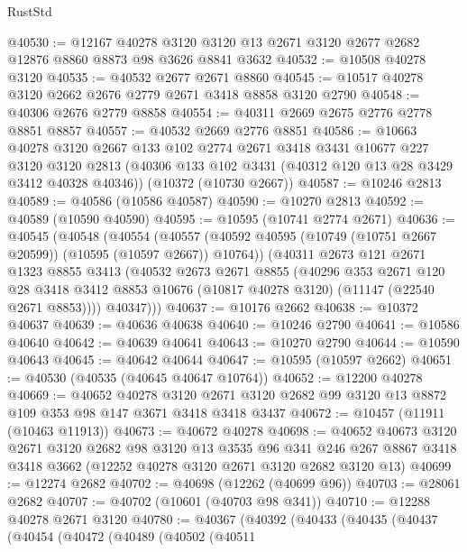 \begin{lexlean}{RustStd}
\begin{coremodule}
@40530 := @12167
    @40278
    @3120
    @3120
    @13
    @2671
    @3120
    @2677
    @2682
    @12876
    @8860
    @8873
    @98
    @3626
    @8841
    @3632
@40532 := @10508 @40278 @3120
@40535 := @40532 @2677 @2671 @8860
@40545 := @10517 @40278 @3120 @2662 @2676 @2779 @2671 @3418 @8858 @3120 @2790
@40548 := @40306 @2676 @2779 @8858
@40554 := @40311 @2669 @2675 @2776 @2778 @8851 @8857
@40557 := @40532 @2669 @2776 @8851
@40586 := @10663
    @40278
    @3120
    @2667
    @133
    @102
    @2774
    @2671
    @3418
    @3431
    @10677
    @227
    @3120
    @3120
    @2813
    (@40306 @133 @102 @3431 (@40312 @120 @13 @28 @3429 @3412 @40328 @40346))
    (@10372 (@10730 @2667))
@40587 := @10246 @2813
@40589 := @40586 (@10586 @40587)
@40590 := @10270 @2813
@40592 := @40589 (@10590 @40590)
@40595 := @10595 (@10741 @2774 @2671)
@40636 := @40545
    (@40548
      (@40554
        (@40557 (@40592 @40595 (@10749 (@10751 @2667 @20599)) (@10595 (@10597 @2667)) @10764))
        (@40311
          @2673
          @121
          @2671
          @1323
          @8855
          @3413
          (@40532
            @2673
            @2671
            @8855
            (@40296
              @353
              @2671
              @120
              @28
              @3418
              @3412
              @8853
              @10676
              (@10817 @40278 @3120)
              (@11147 (@22540 @2671 @8853))))
          @40347)))
@40637 := @10176 @2662
@40638 := @10372 @40637
@40639 := @40636 @40638
@40640 := @10246 @2790
@40641 := @10586 @40640
@40642 := @40639 @40641
@40643 := @10270 @2790
@40644 := @10590 @40643
@40645 := @40642 @40644
@40647 := @10595 (@10597 @2662)
@40651 := @40530 (@40535 (@40645 @40647 @10764))
@40652 := @12200 @40278
@40669 := @40652
    @40278
    @3120
    @2671
    @3120
    @2682
    @99
    @3120
    @13
    @8872
    @109
    @353
    @98
    @147
    @3671
    @3418
    @3418
    @3437
@40672 := @10457 (@11911 (@10463 @11913))
@40673 := @40672 @40278
@40698 := @40652
    @40673
    @3120
    @2671
    @3120
    @2682
    @98
    @3120
    @13
    @3535
    @96
    @341
    @246
    @267
    @8867
    @3418
    @3418
    @3662
    (@12252 @40278 @3120 @2671 @3120 @2682 @3120 @13)
@40699 := @12274 @2682
@40702 := @40698 (@12262 (@40699 @96))
@40703 := @28061 @2682
@40707 := @40702 (@10601 (@40703 @98 @341))
@40710 := @12288 @40278 @2671 @3120
@40780 := @40367
    (@40392
      (@40433
        (@40435
          (@40437
            (@40454
              (@40472
                (@40489
                  (@40502
                    (@40511

\end{coremodule}
\end{lexlean}

